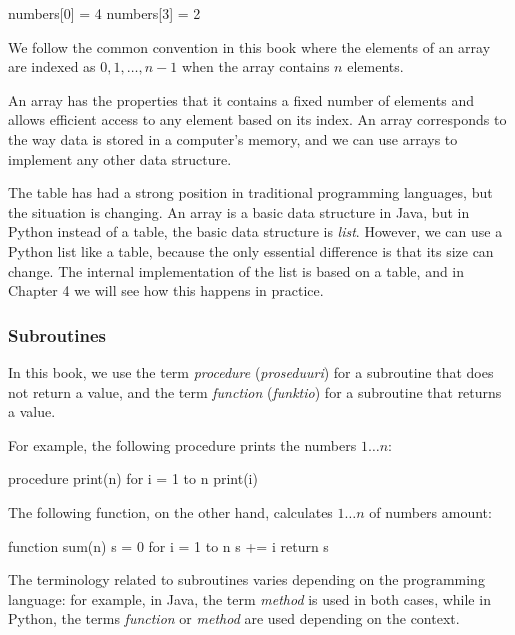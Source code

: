 \begin{code}
    numbers[0] = 4
    numbers[3] = 2
\end{code}

We follow the common convention in this book where the elements of an array are indexed
as $0,1,\dots,n-1$ when the array contains $n$ elements.

An array has the properties that it contains a fixed number of elements
and allows efficient access to any element based on its index.
An array corresponds to the way data is stored in a computer's memory,
and we can use arrays to implement any other data structure.


The table has had a strong position in traditional programming languages, but the situation is changing.
An array is a basic data structure in Java, but in Python
instead of a table, the basic data structure is \emph{list}.
However, we can use a Python list like a table,
because the only essential difference is that its size can change.
The internal implementation of the list is based on a table,
and in Chapter 4 we will see how this happens in practice.

\subsubsection{Subroutines}


In this book, we use the term \emph{procedure} (\emph{proseduuri})
for a subroutine that does not return a value,
and the term \emph{function} (\emph{funktio})
for a subroutine that returns a value.

For example, the following procedure prints the numbers $1 \dots n$:

\begin{code}
    procedure print(n)
    for i = 1 to n
    print(i)
\end{code}


The following function, on the other hand, calculates $1 \dots n$ of numbers amount:

\begin{code}
    function sum(n)
    s = 0
    for i = 1 to n
    s += i
    return s
\end{code}

The terminology related to subroutines varies depending on the programming language:
for example, in Java, the term \emph{method} is used in both cases,
while in Python, the terms \emph{function} or \emph{method} are used depending on the context.

